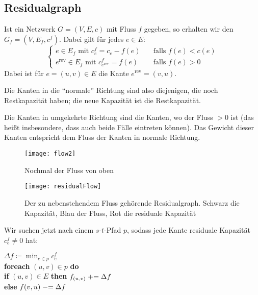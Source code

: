 \subsection{Residualgraph}

Ist ein Netzwerk \( G = (V, E, c) \) mit Fluss \( f \) gegeben, so erhalten wir den  \( G_f = (V, E_f, c^f) \). Dabei gilt für jedes \( e \in E \):
\begin{equation*}
  \begin{cases}
    e \in E_f \text{ mit } c_e^f = c_e - f(e) \quad &\text{falls } f(e) < c(e)  \\
    e^\text{rev} \in E_f \text{ mit } c_{e^\text{rev}}^f = f(e) \quad &\text{falls } f(e) > 0
  \end{cases}
\end{equation*}
Dabei ist für \( e = (u,v) \in E \) die Kante \( e^\text{rev} = (v,u) \).

Die Kanten in die ``normale'' Richtung sind also diejenigen, die noch Restkapazität haben; die neue Kapazität ist die Restkapazität.

Die Kanten in umgekehrte Richtung sind die Kanten, wo der Fluss \( > 0 \) ist (das heißt insbesondere, dass auch beide Fälle eintreten können). Das Gewicht dieser Kanten entspricht dem Fluss der Kanten in normale Richtung.

\begin{minipage}{.475\textwidth}
  \begin{figure}[H]
    \texttt{[image: flow2]}
    \caption{Nochmal der Fluss von oben}
  \end{figure}
\end{minipage}
\hfill
\begin{minipage}{.475\textwidth}
  \vspace{6.8mm}
  \begin{figure}[H]
    \texttt{[image: residualFlow]}
    \caption{Der zu nebenstehendem Fluss gehörende Residualgraph. Schwarz die Kapazität, Blau der Fluss, Rot die residuale Kapazität}
  \end{figure}
\end{minipage}

Wir suchen jetzt nach einem \( s \)-\( t \)-Pfad \( p \), sodass jede Kante residuale Kapazität \( c_e^f \neq 0 \) hat:

\begin{pseudocode}
  \( \Delta f \coloneqq \min_{e \in p}c_e^f \) \\
  \textbf{foreach} \( (u,v) \in p \) \textbf{do} \\
  \phantom{\enskip} \textbf{if} \( (u,v) \in E \) \textbf{then} \( f_{(u,v)} \mathrel{+}= \Delta f \) \\
  \phantom{\enskip} \textbf{else} \( f{(v,u)} \mathrel{-}= \Delta f \)
\end{pseudocode}


